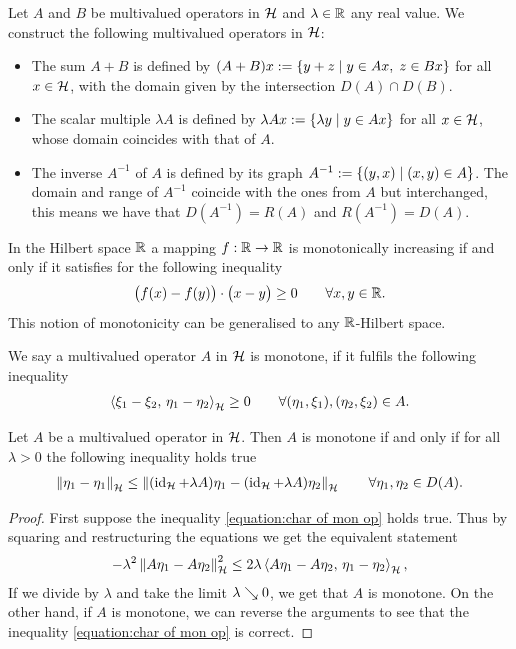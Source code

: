 \begin{definition}
	Let $ A $ and $ B $ be multivalued operators in $ \mathcal{H} $ and $ \lambda \in \mathbb{R}$ any real value. We construct the following multivalued operators in $ \mathcal{H} $:
	\begin{itemize}
		\item The sum $ A+B $ is defined by $ (A+B)x:=\{y+z \;\vert\; y \in Ax,\; z \in Bx\} $ for all $ x\in\mathcal{H} $, with the domain given by the intersection $ D(A)\cap D(B) $.
		\item The scalar multiple $ \lambda A $ is defined by 
		$ \lambda Ax:=\{\lambda y \;\vert\; y \in Ax\} $ for all $ x\in\mathcal{H} $, 
		whose domain coincides with that of $ A $.
		\item The inverse $ A^{-1} $ of $ A $ is defined by its graph 
		$ A^{-1}:=\{(y,x) \;\vert\; (x,y) \in A\} $. The domain and range of $ A^{-1} $ 
		coincide with the ones from $ A $ but interchanged, 
		this means we have that $ D(A^{-1}) = R(A) $ and $ R(A^{-1}) = D(A) $.
	\end{itemize}
\end{definition}

In the Hilbert space $ \mathbb{R} $ a mapping $ f:\mathbb{R}\rightarrow\mathbb{R} $ is monotonically 
increasing if and only if 
it satisfies for the following inequality
\begin{align*}
	\big(f(x)-f(y)\big)\cdot \big(x-y\big)\geq 0
	\qquad \forall x,y\in\mathbb{R}.
\end{align*} 
This notion of monotonicity can be generalised to any $ \mathbb{R} $-Hilbert space.

\begin{definition}
	We say a multivalued operator $ A $ in $ \mathcal{H} $ is monotone, 
	if it fulfils the following inequality
	\begin{align*}
		\left\langle \xi_1-\xi_2,\,\eta_1-\eta_2\right\rangle_{\mathcal{H}}\geq 0
		\qquad \forall (\eta_1,\xi_1),(\eta_2,\xi_2)\in A.
	\end{align*}
\end{definition}

\begin{lemma}\label{lemma:char of mon op}
	Let $ A $ be a multivalued operator in $ \mathcal{H} $.
	Then $ A $ is monotone if and only if
	for all $ \lambda>0 $ the following inequality holds true
	\begin{align}\label{equation:char of mon op}
		\left\Vert \eta_1-\eta_1\right\Vert_{\mathcal{H}}\leq 
		\left\Vert (\operatorname{\mathrm{id}}_{\mathcal{H}}+\lambda A)\eta_1-(\operatorname{\mathrm{id}}_{\mathcal{H}}+\lambda A)\eta_2\right\Vert_{\mathcal{H}}
		\qquad\forall \eta_1,\eta_2\in D(A).
	\end{align}
\end{lemma}
\begin{proof}
	First suppose the inequality \eqref{equation:char of mon op} 
	holds true. Thus by squaring and restructuring the equations
	we get the equivalent statement
	\begin{align*}
		-\lambda^2 \left\Vert A\eta_1-A\eta_2\right\Vert_{\mathcal{H}}^2\leq 2\lambda 
		\left\langle A\eta_1-A\eta_2,\,\eta_1-\eta_2\right\rangle_{\mathcal{H}},
	\end{align*}
	If we divide by $ \lambda $ and take the limit $ \lambda\searrow 0 $,
	we get that $ A $ is monotone. On the other hand, if $ A $ is
	monotone, we can reverse the arguments to see that the inequality
	\eqref{equation:char of mon op} is correct.
\end{proof}

